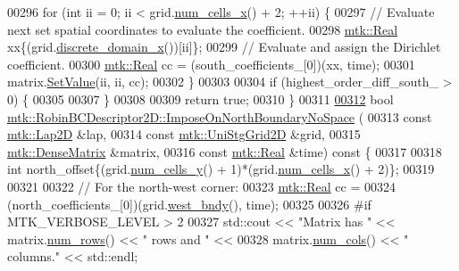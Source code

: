 \begin{DoxyCode}
00296   \textcolor{keywordflow}{for} (\textcolor{keywordtype}{int} ii = 0; ii < grid.\hyperlink{classmtk_1_1UniStgGrid2D_a2d182866a398aba8e4829590e85bf939}{num\_cells\_x}() + 2; ++ii) \{
00297     \textcolor{comment}{// Evaluate next set spatial coordinates to evaluate the coefficient.}
00298     \hyperlink{group__c01-roots_gac080bbbf5cbb5502c9f00405f894857d}{mtk::Real} xx\{(grid.\hyperlink{classmtk_1_1UniStgGrid2D_ab2f70cf5cd0a2d5486992d9f2f8baa4a}{discrete\_domain\_x}())[ii]\};
00299     \textcolor{comment}{// Evaluate and assign the Dirichlet coefficient.}
00300     \hyperlink{group__c01-roots_gac080bbbf5cbb5502c9f00405f894857d}{mtk::Real} cc = (south\_coefficients\_[0])(xx, time);
00301     matrix.\hyperlink{classmtk_1_1DenseMatrix_a784ce5784109ac86bfb9d8562b334b13}{SetValue}(ii, ii, cc);
00302   \}
00303 
00304   \textcolor{keywordflow}{if} (highest\_order\_diff\_south\_ > 0) \{
00305 
00307   \}
00308 
00309   \textcolor{keywordflow}{return} \textcolor{keyword}{true};
00310 \}
00311 
\hypertarget{mtk__robin__bc__descriptor__2d_8cc_source_l00312}{}\hyperlink{classmtk_1_1RobinBCDescriptor2D_a3bc22c1d5a7a4d7c2130351cbfa35135}{00312} \textcolor{keywordtype}{bool} \hyperlink{classmtk_1_1RobinBCDescriptor2D_a3bc22c1d5a7a4d7c2130351cbfa35135}{mtk::RobinBCDescriptor2D::ImposeOnNorthBoundaryNoSpace}
      (
00313     \textcolor{keyword}{const} \hyperlink{classmtk_1_1Lap2D}{mtk::Lap2D} &lap,
00314     \textcolor{keyword}{const} \hyperlink{classmtk_1_1UniStgGrid2D}{mtk::UniStgGrid2D} &grid,
00315     \hyperlink{classmtk_1_1DenseMatrix}{mtk::DenseMatrix} &matrix,
00316     \textcolor{keyword}{const} \hyperlink{group__c01-roots_gac080bbbf5cbb5502c9f00405f894857d}{mtk::Real} &time)\textcolor{keyword}{ const }\{
00317 
00318   \textcolor{keywordtype}{int} north\_offset\{(grid.\hyperlink{classmtk_1_1UniStgGrid2D_aed05a801cc9a76dba0ff203cea58a61a}{num\_cells\_y}() + 1)*(grid.\hyperlink{classmtk_1_1UniStgGrid2D_a2d182866a398aba8e4829590e85bf939}{num\_cells\_x}() + 2)\};
00319 
00321 
00322   \textcolor{comment}{// For the north-west corner:}
00323   \hyperlink{group__c01-roots_gac080bbbf5cbb5502c9f00405f894857d}{mtk::Real} cc =
00324     (north\_coefficients\_[0])(grid.\hyperlink{classmtk_1_1UniStgGrid2D_af2b1712387ded85edaf2b64617d3fc13}{west\_bndy}(), time);
00325 
00326 \textcolor{preprocessor}{  #if MTK\_VERBOSE\_LEVEL > 2}
00327   std::cout << \textcolor{stringliteral}{"Matrix has "} << matrix.\hyperlink{classmtk_1_1DenseMatrix_a53f3afb3b6a8d21854458aaa9663cc74}{num\_rows}() << \textcolor{stringliteral}{" rows and "} <<
00328     matrix.\hyperlink{classmtk_1_1DenseMatrix_a41747502d468c6728a4be31501b16e0e}{num\_cols}() << \textcolor{stringliteral}{" columns."} << std::endl;

\end{DoxyCode}

